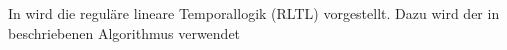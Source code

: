\documentclass[paper=b6,pagesize=automedia,DIV=200]{scrartcl}
\begin{document}
  In \cite{rltl} wird die reguläre lineare
  Temporallogik (RLTL) vorgestellt.
  Dazu wird der in \cite[S. 101--106]{Hopcroft}
  beschriebenen Algorithmus verwendet

  
  
\end{document}
